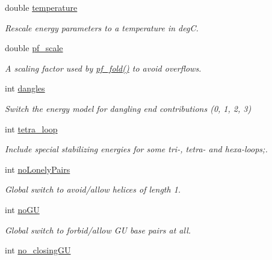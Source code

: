 \begin{DoxyCompactItemize}
\item 
double \hyperlink{group__model__details_gab4b11c8d9c758430960896bc3fe82ead}{temperature}
\begin{DoxyCompactList}\small\item\em Rescale energy parameters to a temperature in deg\+C. \end{DoxyCompactList}\item 
double \hyperlink{group__model__details_gad3b22044065acc6dee0af68931b52cfd}{pf\+\_\+scale}
\begin{DoxyCompactList}\small\item\em A scaling factor used by \hyperlink{group__pf__fold_gadc3db3d98742427e7001a7fd36ef28c2}{pf\+\_\+fold()} to avoid overflows. \end{DoxyCompactList}\item 
int \hyperlink{group__model__details_ga72b511ed1201f7e23ec437e468790d74}{dangles}
\begin{DoxyCompactList}\small\item\em Switch the energy model for dangling end contributions (0, 1, 2, 3) \end{DoxyCompactList}\item 
int \hyperlink{group__model__details_ga4f6265bdf0ead7ff4628a360adbfd77e}{tetra\+\_\+loop}
\begin{DoxyCompactList}\small\item\em Include special stabilizing energies for some tri-\/, tetra-\/ and hexa-\/loops;. \end{DoxyCompactList}\item 
int \hyperlink{group__model__details_ga097eccaabd6ae8b4fef83cccff85bb5d}{no\+Lonely\+Pairs}
\begin{DoxyCompactList}\small\item\em Global switch to avoid/allow helices of length 1. \end{DoxyCompactList}\item 
\hypertarget{group__model__details_gabf380d09e4f1ab94fc6af57cf0ad5d32}{}int \hyperlink{group__model__details_gabf380d09e4f1ab94fc6af57cf0ad5d32}{no\+G\+U}\label{group__model__details_gabf380d09e4f1ab94fc6af57cf0ad5d32}

\begin{DoxyCompactList}\small\item\em Global switch to forbid/allow G\+U base pairs at all. \end{DoxyCompactList}\item 
\hypertarget{group__model__details_gaa8d1c7b92489179e1eafa562b7bdd259}{}int \hyperlink{group__model__details_gaa8d1c7b92489179e1eafa562b7bdd259}{no\+\_\+closing\+G\+U}\label{group__model__details_gaa8d1c7b92489179e1eafa562b7bdd259}


\end{DoxyCompactItemize}
